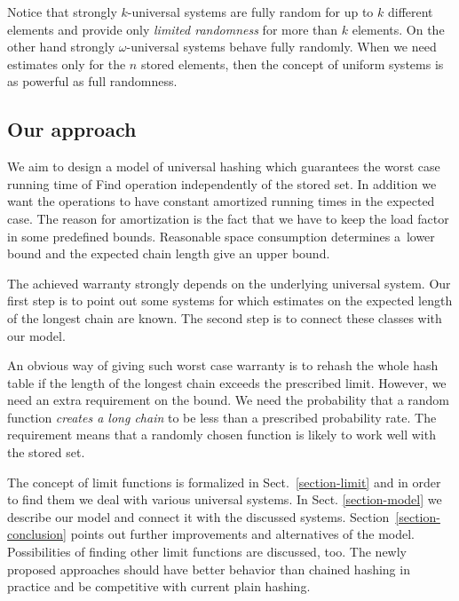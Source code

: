 Notice that strongly $k$-universal systems are fully random for up to $k$ different elements and provide only \emph{limited randomness} for more than $k$ elements. On the other hand strongly $\omega$-universal systems behave fully randomly. When we need estimates only for the $n$ stored elements, then the concept of uniform systems is as powerful as full randomness.

\subsection{Our approach}
We aim to design a model of universal hashing which guarantees the worst case running time of Find operation independently of the stored set. In addition we want the operations to have constant amortized running times in the expected case. The reason for amortization is the fact that we have to keep the load factor in some predefined bounds. Reasonable space consumption determines a~lower bound and the expected chain length give an upper bound.

The achieved warranty strongly depends on the underlying universal system. Our first step is to point out some systems for which estimates on the expected length of the longest chain are known. The second step is to connect these classes with our model.

An obvious way of giving such worst case warranty is to rehash the whole hash table if the length of the longest chain exceeds the prescribed limit. However, we need an extra requirement on the bound. We need the probability that a random function \emph{creates a long chain} to be less than a prescribed probability rate. The requirement means that a randomly chosen function is likely to work well with the stored set.

The concept of limit functions is formalized in Sect.~\ref{section-limit} and in order to find them we deal with various universal systems. In Sect. \ref{section-model} we describe our model and connect it with the discussed systems. Section~\ref{section-conclusion} points out further improvements and alternatives of the model. Possibilities of finding other limit functions are discussed, too. The newly proposed approaches should have better behavior than chained hashing in practice and be competitive with current plain hashing.
